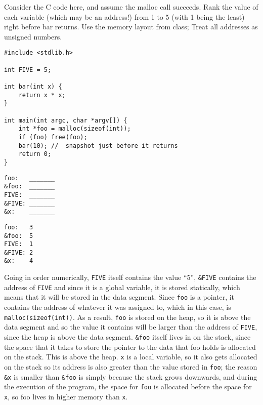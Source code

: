 \begin{blocksection}
\question
Consider the C code here, and assume the malloc call succeeds. Rank the value of each variable (which may be an address!) from 1 to 5 (with 1 being the least) right before bar returns.  Use the memory layout from class;  Treat all addresses as unsigned numbers. 

\begin{verbatim}
#include <stdlib.h> 

int FIVE = 5;

int bar(int x) {
    return x * x;
}

int main(int argc, char *argv[]) { 	
    int *foo = malloc(sizeof(int)); 	
    if (foo) free(foo); 	
    bar(10); //  snapshot just before it returns 	
    return 0; 
}
\end{verbatim}

\begin{verbatim}
foo:   _______
&foo:  _______
FIVE:  _______
&FIVE: _______
&x:    _______
\end{verbatim}

\begin{solution}
\begin{verbatim}
foo:   3
&foo:  5
FIVE:  1
&FIVE: 2
&x:    4
\end{verbatim}

Going in order numerically, \lstinline$FIVE$ itself contains the value “5”, \lstinline$&FIVE$ contains the address of \lstinline$FIVE$ and since it is a global variable, it is stored statically, which means that it will be stored in the data segment. Since \lstinline$foo$ is a pointer, it contains the address of whatever it was assigned to, which in this case, is \lstinline$malloc(sizeof(int))$. As a result, \lstinline$foo$ is stored on the heap, so it is above the data segment and so the value it contains will be larger than the address of \lstinline$FIVE$, since the heap is above the data segment. \lstinline$&foo$ itself lives in on the stack, since the space that it takes to store the pointer to the data that foo holds is allocated on the stack. This is above the heap. \lstinline$x$ is a local variable, so it also gets allocated on the stack so its address is also greater than the value stored in \lstinline$foo$; the reason \lstinline$&x$ is smaller than \lstinline$&foo$ is simply because the stack grows downwards, and during the execution of the program, the space for \lstinline$foo$ is allocated before the space for \lstinline$x$, so foo lives in higher memory than \lstinline$x$.
\end{solution}

\end{blocksection}
